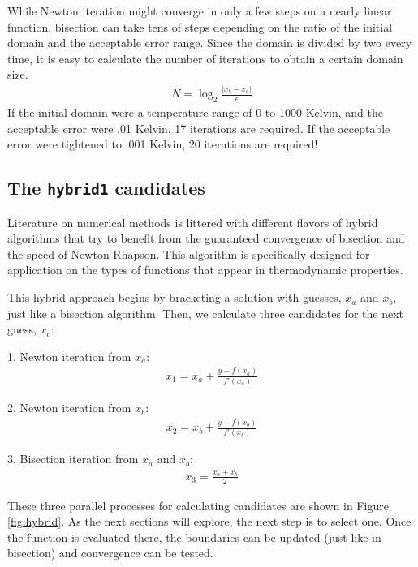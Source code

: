 While Newton iteration might converge in only a few steps on a nearly linear function, bisection can take tens of steps depending on the ratio of the initial domain and the acceptable error range.  Since the domain is divided by two every time, it is easy to calculate the number of iterations to obtain a certain domain size.
\begin{align}
N = \log_2 \frac{|x_b - x_a|}{\epsilon}
\end{align}
If the initial domain were a temperature range of 0 to 1000 Kelvin, and the acceptable error were .01 Kelvin, 17 iterations are required.  If the acceptable error were tightened to .001 Kelvin, 20 iterations are required!

\subsection{The \texttt{hybrid1} candidates}

Literature on numerical methods is littered with different flavors of hybrid algorithms that try to benefit from the guaranteed convergence of bisection and the speed of Newton-Rhapson.  This algorithm is specifically designed for application on the types of functions that appear in thermodynamic properties.

This hybrid approach begins by bracketing a solution with guesses, $x_a$ and $x_b$, just like a bisection algorithm.  Then, we calculate three candidates for the next guess, $x_c$:

1. Newton iteration from $x_a$: 
\begin{align}
x_1 = x_a + \frac{y-f(x_a)}{f'(x_a)}
\end{align}

2. Newton iteration from $x_b$:
\begin{align}
x_2 = x_b + \frac{y-f(x_b)}{f'(x_b)}
\end{align}

3. Bisection iteration from $x_a$ and $x_b$:
\begin{align}
x_3 = \frac{x_a + x_b}{2}
\end{align}

These three parallel processes for calculating candidates are shown in Figure \ref{fig:hybrid}.  As the next sections will explore, the next step is to select one.  Once the function is evaluated there, the boundaries can be updated (just like in bisection) and convergence can be tested.


